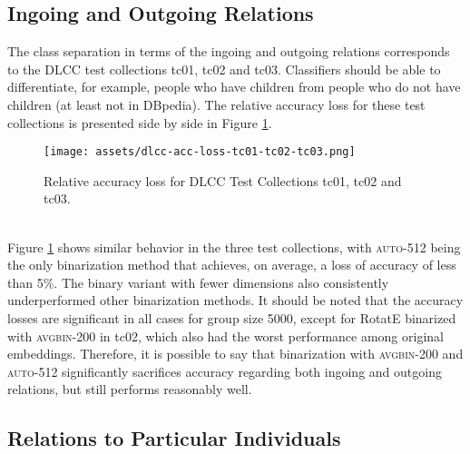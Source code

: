 \documentclass[11pt,titlepage,oneside,openany]{book}
\begin{document}
\subsection{Ingoing and Outgoing Relations}
\label{subsubsec:tc01-tc02-tc03}

The class separation in terms of the ingoing and outgoing relations corresponds to the DLCC test collections tc01, tc02 and tc03. Classifiers should be able to differentiate, for example, people who have children from people who do not have children (at least not in DBpedia). The relative accuracy loss for these test collections is presented side by side in Figure \ref{fig:dlcc-acc-loss-tc01-tc02-tc03}.\\
\begin{figure}[h!]
    \centering
    \centerline{\texttt{[image: assets/dlcc-acc-loss-tc01-tc02-tc03.png]}}
    \vspace*{-3mm}
    \caption{Relative accuracy loss for DLCC Test Collections tc01, tc02 and tc03.}
    \label{fig:dlcc-acc-loss-tc01-tc02-tc03}
\end{figure}
\\
Figure \ref{fig:dlcc-acc-loss-tc01-tc02-tc03} shows similar behavior in the three test collections, with \textsc{auto-512} being the only binarization method that achieves, on average, a loss of accuracy of less than 5\%. The binary variant with fewer dimensions also consistently underperformed other binarization methods. It should be noted that the accuracy losses are significant in all cases for group size 5000, except for RotatE binarized with \textsc{avgbin-200} in tc02, which also had the worst performance among original embeddings. Therefore, it is possible to say that binarization with \textsc{avgbin-200} and \textsc{auto-512} significantly sacrifices accuracy regarding both ingoing and outgoing relations, but still performs reasonably well.


\subsection{Relations to Particular Individuals}
\label{subsubsec:tc04-tc05}
\end{document}
